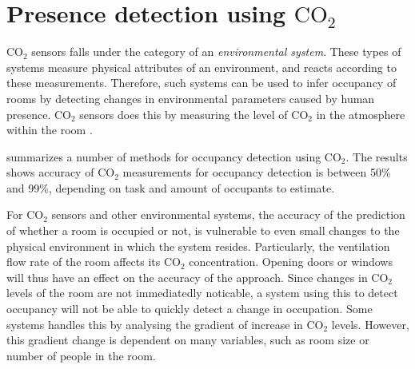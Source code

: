 \section{Presence detection using $\text{CO}_{2}$ }\label{sec:presence_env}
$\text{CO}_{2}$ sensors falls under the category of an \textit{environmental system}. 
These types of systems measure physical attributes of an environment, and reacts according to these measurements.
Therefore, such systems can be used to infer occupancy of rooms by detecting changes in environmental parameters caused by human presence.
$\text{CO}_{2}$ sensors does this by measuring the level of $\text{CO}_{2}$ in the atmosphere within the room \cite{longoAccurateOccupancyEstimation2019, gruberCO2SensorsOccupancy2014}.

\citeauthor{longoAccurateOccupancyEstimation2019}\cite{longoAccurateOccupancyEstimation2019} summarizes a number of methods for occupancy detection using $\text{CO}_{2}$. 
The results shows accuracy of $\text{CO}_{2}$ measurements for occupancy detection is between 50\% and 99\%, depending on task and amount of occupants to estimate.

For $\text{CO}_{2}$ sensors and other environmental systems, the accuracy of the prediction of whether a room is occupied or not, is vulnerable to even small changes to the physical environment in which the system resides.\cite{gruberCO2SensorsOccupancy2014,longoAccurateOccupancyEstimation2019}
Particularly, the ventilation flow rate of the room affects its $\text{CO}_{2}$ concentration. Opening doors or windows will thus have an effect on the accuracy of the approach.
Since changes in $\text{CO}_{2}$ levels of the room are not immediatedly noticable, a system using this to detect occupancy will not be able to quickly detect a change in occupation.
Some systems handles this by analysing the gradient of increase in $\text{CO}_{2}$ levels\cite{gradient_co2}.
However, this gradient change is dependent on many variables, such as room size or number of people in the room. 
